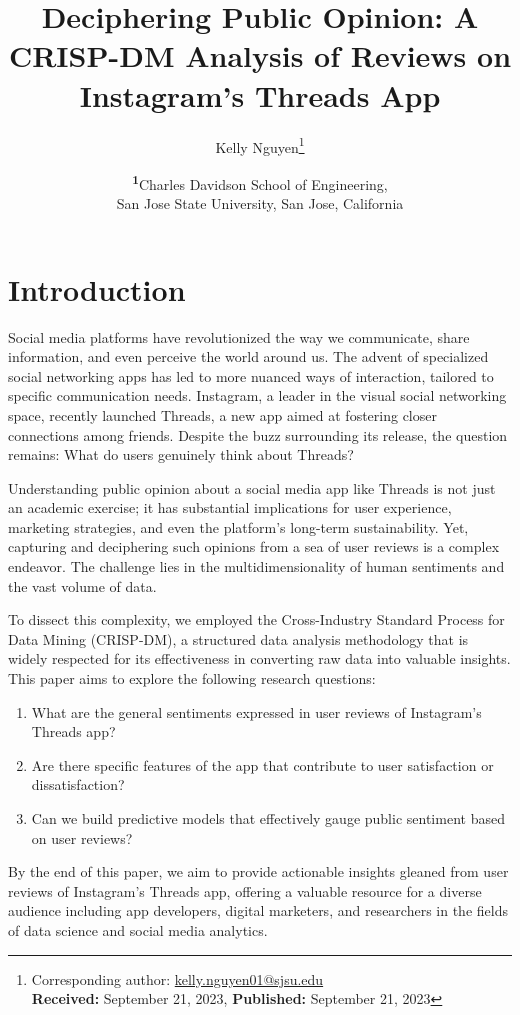 \documentclass[
	a4paper, %
	10pt, %
	unnumberedsections, %
	twoside, %
]{LTJournalArticle}
\title{Deciphering Public Opinion: A CRISP-DM Analysis of Reviews on Instagram's Threads App} %
\author{%
	Kelly Nguyen\thanks{Corresponding author: \href{mailto:kelly.nguyen01@sjsu.edu}{kelly.nguyen01@sjsu.edu}\\ \textbf{Received:} September 21, 2023, \textbf{Published:} September 21, 2023}
}
\date{\footnotesize\textsuperscript{\textbf{1}}Charles Davidson School of Engineering, \\San Jose State University, San Jose, California}
\begin{document}
\maketitle %


\section{Introduction}

Social media platforms have revolutionized the way we communicate, share information, and even perceive the world around us. The advent of specialized social networking apps has led to more nuanced ways of interaction, tailored to specific communication needs. Instagram, a leader in the visual social networking space, recently launched Threads, a new app aimed at fostering closer connections among friends. Despite the buzz surrounding its release, the question remains: What do users genuinely think about Threads?

Understanding public opinion about a social media app like Threads is not just an academic exercise; it has substantial implications for user experience, marketing strategies, and even the platform's long-term sustainability. Yet, capturing and deciphering such opinions from a sea of user reviews is a complex endeavor. The challenge lies in the multidimensionality of human sentiments and the vast volume of data.

To dissect this complexity, we employed the Cross-Industry Standard Process for Data Mining (CRISP-DM), a structured data analysis methodology that is widely respected for its effectiveness in converting raw data into valuable insights. This paper aims to explore the following research questions:
\begin{enumerate}
	\item What are the general sentiments expressed in user reviews of Instagram's Threads app?
	\item Are there specific features of the app that contribute to user satisfaction or dissatisfaction?
	\item Can we build predictive models that effectively gauge public sentiment based on user reviews?
\end{enumerate}
By the end of this paper, we aim to provide actionable insights gleaned from user reviews of Instagram's Threads app, offering a valuable resource for a diverse audience including app developers, digital marketers, and researchers in the fields of data science and social media analytics.
\end{document}
